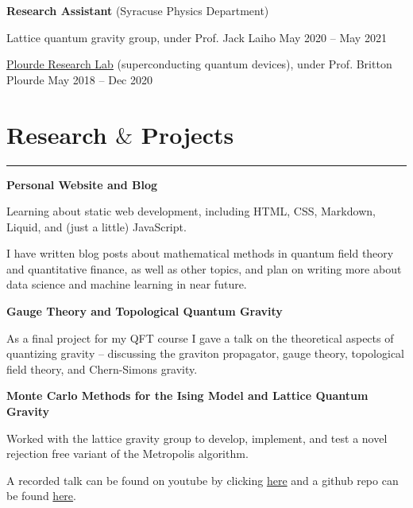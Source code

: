 \documentclass{article}
\newcommand{\myline}{\rule[\baselineskip]{\linewidth}{1pt}}
\begin{document}
\large\textbf{Research Assistant} \normalsize (Syracuse Physics Department)
\normalsize

\begin{compactitem}
\item Lattice quantum gravity group, under Prof. Jack Laiho \hfill \small May 2020 -- May 2021 
\normalsize
\item \href{https://bplourde.expressions.syr.edu/}{Plourde Research Lab} (superconducting quantum devices), under Prof. Britton Plourde \hfill \small May 2018 -- Dec 2020
\end{compactitem}




\section{Research $\&$ Projects}
\myline

\large\textbf{Personal Website and Blog}
\normalsize

\begin{compactitem}
\item Learning about static web development, including HTML, CSS, Markdown, Liquid, and (just a little) JavaScript. 
\item I have written blog posts about mathematical methods in quantum field theory and quantitative finance, as well as other topics, and plan on writing more about data science and machine learning in near future. 
\end{compactitem}



\large\textbf{Gauge Theory and Topological Quantum Gravity}
\normalsize

\begin{compactitem}
\item As a final project for my QFT course I gave a talk on the theoretical aspects of quantizing gravity -- discussing the graviton propagator, gauge theory, topological field theory, and Chern-Simons gravity.
\end{compactitem}


\large\textbf{Monte Carlo Methods for the Ising Model and Lattice Quantum Gravity}
\normalsize

\begin{compactitem}
\item Worked with the lattice gravity group to develop, implement, and test a novel rejection free variant of the Metropolis algorithm. 
\item A recorded talk can be found on youtube by clicking \href{https://www.youtube.com/watch?v=_Ppx0e3aG-E&t=2s}{here} and a github repo can be found \href{https://github.com/aarontrowbridge/Ising}{here}.
\end{compactitem}
\end{document}
